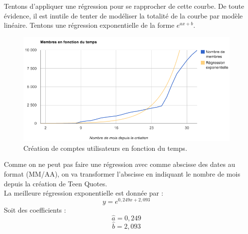 \documentclass{report}
\begin{document}
	Tentons d'appliquer une régression pour se rapprocher de cette courbe. De toute évidence, il est inutile de tenter de modéliser la totalité de la courbe par modèle linéaire. Tentons une régression exponentielle de la forme $e^{ax + b}$.
	\begin{figure}[H]
		\center
		\includegraphics[width=450px]{images/membresRegression.png}
		\caption{Création de comptes utilisateurs en fonction du temps.}
	\end{figure}
	Comme on ne peut pas faire une régression avec comme abscisse des dates au format (MM/AA), on va transformer l'abscisse en indiquant le nombre de mois depuis la création de Teen Quotes.\\
	La meilleure régression exponentielle est donnée par :
	\[y = e^{0,249x + 2,093}\]
	Soit des coefficients :
	\[\widehat{a} = 0,249\]
	\[\widehat{b} = 2,093\]
\end{document}
